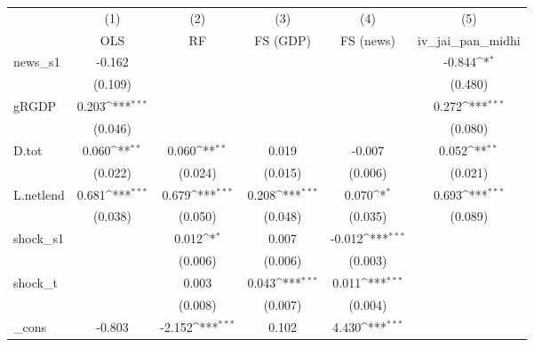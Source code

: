 {
\def\sym#1{\ifmmode^{#1}\else\(^{#1}\)\fi}
\begin{tabular}{l*{5}{c}}
\toprule
            &\multicolumn{1}{c}{(1)}&\multicolumn{1}{c}{(2)}&\multicolumn{1}{c}{(3)}&\multicolumn{1}{c}{(4)}&\multicolumn{1}{c}{(5)}\\
            &\multicolumn{1}{c}{OLS}&\multicolumn{1}{c}{RF}&\multicolumn{1}{c}{FS (GDP)}&\multicolumn{1}{c}{FS (news)}&\multicolumn{1}{c}{iv\_jai\_pan\_midhi}\\
\midrule
news\_s1     &      -0.162         &                     &                     &                     &      -0.844\sym{*}  \\
            &     (0.109)         &                     &                     &                     &     (0.480)         \\
\addlinespace
gRGDP       &       0.203\sym{***}&                     &                     &                     &       0.272\sym{***}\\
            &     (0.046)         &                     &                     &                     &     (0.080)         \\
\addlinespace
D.tot       &       0.060\sym{**} &       0.060\sym{**} &       0.019         &      -0.007         &       0.052\sym{**} \\
            &     (0.022)         &     (0.024)         &     (0.015)         &     (0.006)         &     (0.021)         \\
\addlinespace
L.netlend   &       0.681\sym{***}&       0.679\sym{***}&       0.208\sym{***}&       0.070\sym{*}  &       0.693\sym{***}\\
            &     (0.038)         &     (0.050)         &     (0.048)         &     (0.035)         &     (0.089)         \\
\addlinespace
shock\_s1    &                     &       0.012\sym{*}  &       0.007         &      -0.012\sym{***}&                     \\
            &                     &     (0.006)         &     (0.006)         &     (0.003)         &                     \\
\addlinespace
shock\_t     &                     &       0.003         &       0.043\sym{***}&       0.011\sym{***}&                     \\
            &                     &     (0.008)         &     (0.007)         &     (0.004)         &                     \\
\addlinespace
\_cons      &      -0.803         &      -2.152\sym{***}&       0.102         &       4.430\sym{***}&                     \\

\end{tabular}}
